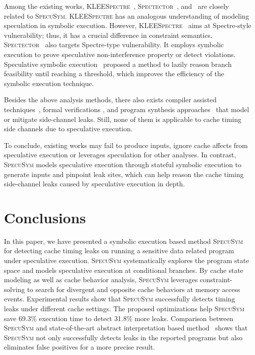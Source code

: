 \documentclass[sigconf,screen]{acmart}
\newcommand\ignore[1]{}
\newcommand{\SpecuSym}{\textsc{SpecuSym} }
\begin{document}
Among the existing works, \textsc{KLEESpectre}~\cite{WangCBMR19}, 
\textsc{Spectector}~\cite{GuarnieriKMRS19}, and~\cite{ZhangCW12} are 
closely related to \textsc{SpecuSym}. \textsc{KLEESpectre}
\cite{WangCBMR19} has an analogous understanding of modeling speculation 
in symbolic execution. However, \textsc{KLEESpectre}~\cite{WangCBMR19} 
aims at Spectre-style vulnerability; thus, it has a crucial difference 
in constraint semantics. \textsc{Spectector}~\cite{WangCBMR19} also 
targets Spectre-type vulnerability. It employs symbolic execution to 
prove speculative non-interference property or detect violations. 
Speculative symbolic execution~\cite{ZhangCW12} proposed a method to 
lazily reason branch feasibility until reaching a threshold, which 
improves the efficiency of the symbolic execution technique.



Besides the above analysis methods, there also exists compiler assisted 
techniques~\cite{DoychevK17,WangS17,SungPW18,WuGSW18,WangSW19}, formal 
verifications 
\cite{EldibWS14,EldibWTS14,ChenFD17,SousaD16,AntoGHKTW17,ZhangGSW18}, 
and program synthesis approaches~\cite{MaffeiR17,EldibW14,EldibWW16}
that model or mitigate side-channel leaks. Still, none of them is 
applicable to cache timing side channels due to speculative execution.



\ignore{
Doychev et al.~\cite{DoychevK17}studied that compiler optimization can 
remove cache side channels. Sung et al.~\cite{SungPW18} developed a 
compiler frontend transformation that models cache timing behaviors 
for verification purposes.
}


To conclude, existing works may fail to produce inputs, ignore cache 
affects from speculative execution or leverages speculation for other 
analyses. In contrast, \SpecuSym models speculative execution through 
stateful symbolic execution to generate inputs and pinpoint leak sites, 
which can help reason the cache timing side-channel leaks caused by 
speculative execution in depth. 


\section{Conclusions}
\label{sec:conclusion}


In this paper, we have presented a symbolic execution based method 
\SpecuSym for detecting cache timing leaks on running a sensitive data 
related program under speculative execution. \SpecuSym systematically 
explores the program state space and models speculative execution at 
conditional branches. By cache state modeling as well as cache behavior 
analysis, \SpecuSym leverages constraint-solving to search for divergent 
and opposite cache behaviors at memory access events. Experimental results
show that \SpecuSym successfully detects timing leaks under different cache 
settings. The proposed optimizations help \SpecuSym save 69.3\% execution 
time to detect 31.8\% more leaks. Comparison between \SpecuSym 
and state-of-the-art abstract interpretation based method~\cite{WuW19} shows 
that \SpecuSym not only successfully detects leaks in the reported programs 
but also eliminates false positives for a more precise result.
\end{document}

